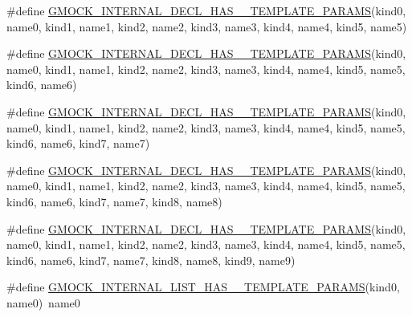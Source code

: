 \begin{DoxyCompactItemize}
\#define \mbox{\hyperlink{_obj__test_2lib_2googletest-master_2googlemock_2include_2gmock_2gmock-generated-actions_8h_a4c90362350df0faa6e866642f44708fe}{G\+M\+O\+C\+K\+\_\+\+I\+N\+T\+E\+R\+N\+A\+L\+\_\+\+D\+E\+C\+L\+\_\+\+H\+A\+S\+\_\+\_\+\+T\+E\+M\+P\+L\+A\+T\+E\+\_\+\+P\+A\+R\+A\+MS}}(kind0,  name0,  kind1,  name1,  kind2,  name2,  kind3,  name3,  kind4,  name4,  kind5,  name5)
\item 
\#define \mbox{\hyperlink{_obj__test_2lib_2googletest-master_2googlemock_2include_2gmock_2gmock-generated-actions_8h_aaafa5e8b1a116aa8e7f88653415e60cd}{G\+M\+O\+C\+K\+\_\+\+I\+N\+T\+E\+R\+N\+A\+L\+\_\+\+D\+E\+C\+L\+\_\+\+H\+A\+S\+\_\+\_\+\+T\+E\+M\+P\+L\+A\+T\+E\+\_\+\+P\+A\+R\+A\+MS}}(kind0,  name0,  kind1,  name1,  kind2,  name2,  kind3,  name3,  kind4,  name4,  kind5,  name5,  kind6,  name6)
\item 
\#define \mbox{\hyperlink{_obj__test_2lib_2googletest-master_2googlemock_2include_2gmock_2gmock-generated-actions_8h_a8d8ec2523daa6fc6c5b8f6a45898e0b1}{G\+M\+O\+C\+K\+\_\+\+I\+N\+T\+E\+R\+N\+A\+L\+\_\+\+D\+E\+C\+L\+\_\+\+H\+A\+S\+\_\+\_\+\+T\+E\+M\+P\+L\+A\+T\+E\+\_\+\+P\+A\+R\+A\+MS}}(kind0,  name0,  kind1,  name1,  kind2,  name2,  kind3,  name3,  kind4,  name4,  kind5,  name5,  kind6,  name6,  kind7,  name7)
\item 
\#define \mbox{\hyperlink{_obj__test_2lib_2googletest-master_2googlemock_2include_2gmock_2gmock-generated-actions_8h_ae6dd478ff5757fa4e66ef2dcf6e22325}{G\+M\+O\+C\+K\+\_\+\+I\+N\+T\+E\+R\+N\+A\+L\+\_\+\+D\+E\+C\+L\+\_\+\+H\+A\+S\+\_\+\_\+\+T\+E\+M\+P\+L\+A\+T\+E\+\_\+\+P\+A\+R\+A\+MS}}(kind0,  name0,  kind1,  name1,  kind2,  name2,  kind3,  name3,  kind4,  name4,  kind5,  name5,  kind6,  name6,  kind7,  name7,  kind8,  name8)
\item 
\#define \mbox{\hyperlink{_obj__test_2lib_2googletest-master_2googlemock_2include_2gmock_2gmock-generated-actions_8h_aa3db5758c68ca3a45a795d91fea7bb42}{G\+M\+O\+C\+K\+\_\+\+I\+N\+T\+E\+R\+N\+A\+L\+\_\+\+D\+E\+C\+L\+\_\+\+H\+A\+S\+\_\+\_\+\+T\+E\+M\+P\+L\+A\+T\+E\+\_\+\+P\+A\+R\+A\+MS}}(kind0,  name0,  kind1,  name1,  kind2,  name2,  kind3,  name3,  kind4,  name4,  kind5,  name5,  kind6,  name6,  kind7,  name7,  kind8,  name8,  kind9,  name9)
\item 
\#define \mbox{\hyperlink{_obj__test_2lib_2googletest-master_2googlemock_2include_2gmock_2gmock-generated-actions_8h_a900f637cda387230021133903f5e078b}{G\+M\+O\+C\+K\+\_\+\+I\+N\+T\+E\+R\+N\+A\+L\+\_\+\+L\+I\+S\+T\+\_\+\+H\+A\+S\+\_\+\_\+\+T\+E\+M\+P\+L\+A\+T\+E\+\_\+\+P\+A\+R\+A\+MS}}(kind0,  name0)~name0

\end{DoxyCompactItemize}
